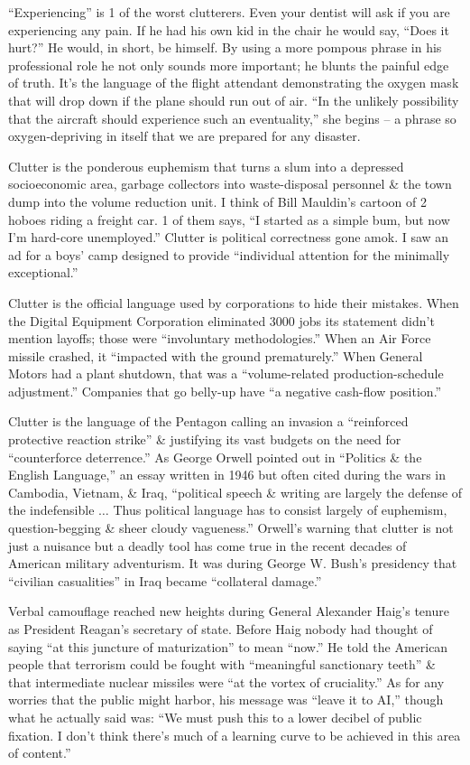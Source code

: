 \documentclass{article}
\begin{document}
``Experiencing'' is 1 of the worst clutterers. Even your dentist will ask if you are experiencing any pain. If he had his own kid in the chair he would say, ``Does it hurt?'' He would, in short, be himself. By using a more pompous phrase in his professional role he not only sounds more important; he blunts the painful edge of truth. It's the language of the flight attendant demonstrating the oxygen mask that will drop down if the plane should run out of air. ``In the unlikely possibility that the aircraft should experience such an eventuality,'' she begins -- a phrase so oxygen-depriving in itself that we are prepared for any disaster.

Clutter is the ponderous euphemism that turns a slum into a depressed socioeconomic area, garbage collectors into waste-disposal personnel \& the town dump into the volume reduction unit. I think of Bill Mauldin's cartoon of 2 hoboes riding a freight car. 1 of them says, ``I started as a simple bum, but now I'm hard-core unemployed.'' Clutter is political correctness gone amok. I saw an ad for a boys' camp designed to provide ``individual attention for the minimally exceptional.''

Clutter is the official language used by corporations to hide their mistakes. When the Digital Equipment Corporation eliminated 3000 jobs its statement didn't mention layoffs; those were ``involuntary methodologies.'' When an Air Force missile crashed, it ``impacted with the ground prematurely.'' When General Motors had a plant shutdown, that was a ``volume-related production-schedule adjustment.'' Companies that go belly-up have ``a negative cash-flow position.''

Clutter is the language of the Pentagon calling an invasion a ``reinforced protective reaction strike'' \& justifying its vast budgets on the need for ``counterforce deterrence.'' As George Orwell pointed out in ``Politics \& the English Language,'' an essay written in 1946 but often cited during the wars in Cambodia, Vietnam, \& Iraq, ``political speech \& writing are largely the defense of the indefensible $\ldots$ Thus political language has to consist largely of euphemism, question-begging \& sheer cloudy vagueness.'' Orwell's warning that clutter is not just a nuisance but a deadly tool has come true in the recent decades of American military adventurism. It was during George W. Bush's presidency that ``civilian casualities'' in Iraq became ``collateral damage.''

Verbal camouflage reached new heights during General Alexander Haig's tenure as President Reagan's secretary of state. Before Haig nobody had thought of saying ``at this juncture of maturization'' to mean ``now.'' He told the American people that terrorism could be fought with ``meaningful sanctionary teeth'' \& that intermediate nuclear missiles were ``at the vortex of cruciality.'' As for any worries that the public might harbor, his message was ``leave it to AI,'' though what he actually said was: ``We must push this to a lower decibel of public fixation. I don't think there's much of a learning curve to be achieved in this area of content.''
\end{document}
